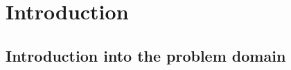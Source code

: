 \documentclass[a4paper,twoside,12pt]{book}
\newcounter{PagesWithoutNumbers}
\begin{document}
\vfill
 
 

\cleardoublepage


\pagestyle{onlyPageNumbers}
\tableofcontents

\setcounter{PagesWithoutNumbers}{\value{page}}
\mainmatter
\pagestyle{PageNumbersChapterTitles}



\chapter{Introduction}

\section{Introduction into the problem domain}
\end{document}
